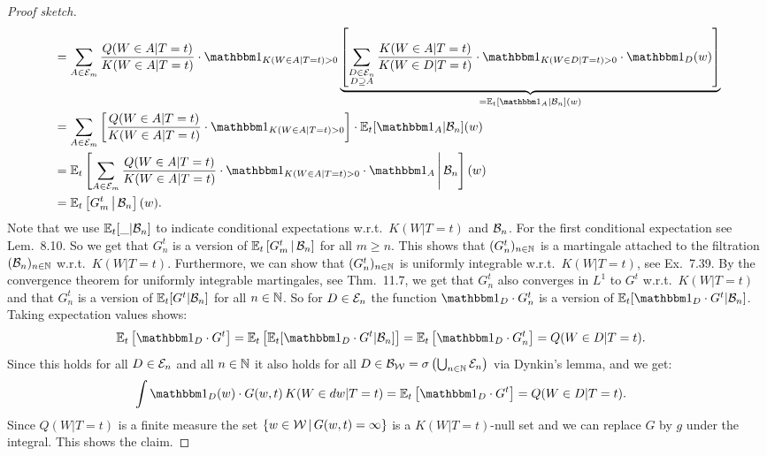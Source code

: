 \begin{Thm}
\begin{proof}[Proof sketch]
\begin{align*}
             &= \sum_{A \in \Ecal_m} \frac{Q(W \in A|T=t)}{K(W \in A|T=t)} \cdot  \I_{K(W \in A|T=t)>0}
             \underbrace{ \lB \sum_{\substack{D \in \Ecal_n\\ D \sni A}}  \frac{K(W \in A|T=t)}{K(W \in D|T=t)}\cdot  \I_{K(W \in D|T=t)>0}   \cdot \I_D(w)\rB }_{=\E_t[\I_A|\Bcal_n](w)}  \\
             &= \sum_{A \in \Ecal_m} \lB \frac{Q(W \in A|T=t)}{K(W \in A|T=t)}  \cdot  \I_{K(W \in A|T=t)>0} \rB \cdot \E_t[\I_A|\Bcal_n](w) \\ 
             &= \E_t\lB \sum_{A \in \Ecal_m} \frac{Q(W \in A|T=t)}{K(W \in A|T=t)} \cdot  \I_{K(W \in A|T=t)>0} \cdot \I_A \st \Bcal_n\rB(w) \\ 
             &= \E_t\lB G_m^t \st \Bcal_n\rB(w).
    \end{align*}
    Note that we use $\mathbb{E}_t[\_|\mathcal{B}_n]$ to indicate conditional expectations w.r.t.\ $K(W|T=t)$ and $\mathcal{B}_n$.
    For the first conditional expectation see \cite{Kle20} Lem.\ 8.10. 
    So we get that $G_n^t$ is a version of $\mathbb{E}_t\left [ G_m^t \,\middle|\, \mathcal{B}_n\right ]$ for all $m \ge n$.
    This shows that $(G_n^t)_{n \in \mathbb{N}}$ is a martingale attached to the filtration $(\mathcal{B}_n)_{n \in \mathbb{N}}$ w.r.t.\ $K(W|T=t)$.
    Furthermore, we can show that $(G_n^t)_{n \in \mathbb{N}}$ is uniformly integrable w.r.t.\ $K(W|T=t)$, see \cite{Kle20} Ex.\ 7.39.
    By the convergence theorem for uniformly integrable martingales, see \cite{Kle20} Thm.\ 11.7, we get that
    $G_n^t$ also converges in $L^1$ to $G^t$ w.r.t.\ $K(W|T=t)$ and that $G_n^t$ is a version of $\mathbb{E}_t[G^t|\mathcal{B}_n]$ for all $n \in \mathbb{N}$. So for $D \in \mathcal{E}_n$ the function $\I_D \cdot G_n^t$ is a version of $\E_t[\I_D \cdot G^t|\Bcal_n]$.
    Taking expectation values shows:
    \begin{align*}
        \E_t\lB \I_D \cdot G^t  \rB & = \E_t\lB\E_t[ \I_D \cdot G^t|\Bcal_n] \rB  
        = \E_t\lB \I_D \cdot G^t_n  \rB 
        = Q(W \in D|T=t). 
    \end{align*}
    Since this holds for all $D \in \mathcal{E}_n$ and all $n \in \mathbb{N}$ it also holds for all
    $D \in \mathcal{B}_{\mathcal{W}}=\sigma\left ( \bigcup_{n \in \mathbb{N}} \mathcal{E}_n\right )$ via Dynkin's lemma, and we get:
    \begin{align*}
        \int \I_D(w) \cdot G(w,t) \, K(W \in dw|T=t) &=
        \E_t\lB \I_D \cdot G^t \rB    = Q(W \in D|T=t). 
    \end{align*}
    Since $Q(W|T=t)$ is a finite measure the set $\left \{ w \in \mathcal{W} \,\middle|\, G(w,t) = \infty \right \}$ is a $K(W|T=t)$-null set
    and we can replace $G$ by $g$ under the integral.
    This shows the claim.
  \end{proof}
\end{Thm}

